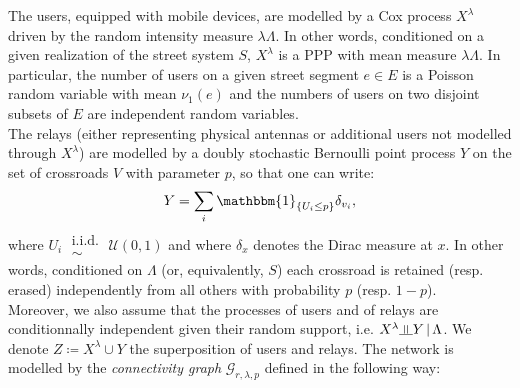 \documentclass[10pt,a4paper]{amsart}
\theoremstyle{exampstyle}
\newtheorem{Proposition}{Proposition}
\newenvironment{Proof}{\noindent{\textit{Proof.}}}{%
\hspace*{\fill}$\Box$\par\vskip2ex}
\theoremstyle{exampnotations}
\newcommand{\indep}{\rotatebox[origin=c]{90}{$\models$}}
\begin{document}
The users, equipped with mobile devices, are modelled by a Cox process $X^{\lambda}$ driven by the random intensity measure $\lambda \Lambda$. In other words, conditioned on a given realization of the street system $S$, $X^{\lambda}$ is a PPP with mean measure $\lambda \Lambda$. In particular, the number of users on a given street segment $e \in E$ is a Poisson random variable with mean $\nu_{1}(e)$ and the numbers of users on two disjoint subsets of $E$ are independent random variables. \\
\indent The relays (either representing physical antennas or additional users not modelled through $X^{\lambda}$) are modelled by a doubly stochastic Bernoulli point process $Y$ on the set of crossroads $V$ with parameter $p$, so that one can write:
\begin{equation*}
Y = \sum_{i} \mathbbm{1}_{\lbrace U_{i} \leq p \rbrace } \delta_{v_{i}},
\end{equation*}
where $U_{i} \;\substack{ \text{i.i.d.} \\ \sim} \; \mathcal{U}(0,1)$ and where $\delta_{x}$ denotes the Dirac measure at $x$. In other words, conditioned on $\Lambda$ (or, equivalently, $S$) each crossroad is retained (resp. erased) independently from all others with probability $p$ (resp. $1-p$). \\
\noindent Moreover, we also assume that the processes of users and of relays  are conditionnally independent given their random support, i.e. $X^{\lambda} \indep Y \, \vert \,  \Lambda$. We denote $Z \coloneqq X^{\lambda} \cup Y$ the superposition of users and relays. 
The network is modelled by the \emph{connectivity graph} $\mathcal{G}_{r,\lambda,p}$ defined in the following way:
\end{document}
